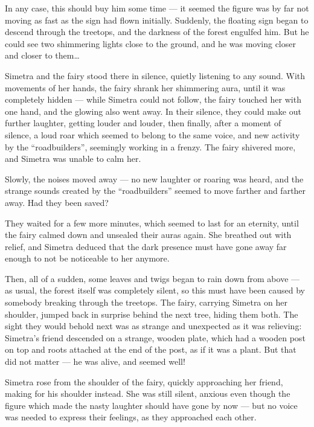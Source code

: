 In any case, this should buy him some time --- it seemed the figure was by far not moving as fast as the sign had flown initially. Suddenly, the floating sign began to descend through the treetops, and the darkness of the forest engulfed him. But he could see two shimmering lights close to the ground, and he was moving closer and closer to them\dots

\froufrou{}

Simetra and the fairy stood there in silence, quietly listening to any sound. With movements of her hands, the fairy shrank her shimmering aura, until it was completely hidden --- while Simetra could not follow, the fairy touched her with one hand, and the glowing also went away. In their silence, they could make out further laughter, getting louder and louder, then finally, after a moment of silence, a loud roar which seemed to belong to the same voice, and new activity by the \enquote{roadbuilders}, seemingly working in a frenzy. The fairy shivered more, and Simetra was unable to calm her.

Slowly, the noises moved away --- no new laughter or roaring was heard, and the strange sounds created by the \enquote{roadbuilders} seemed to move farther and farther away. Had they been saved?

They waited for a few more minutes, which seemed to last for an eternity, until the fairy calmed down and unsealed their auras again. She breathed out with relief, and Simetra deduced that the dark presence must have gone away far enough to not be noticeable to her anymore.

Then, all of a sudden, some leaves and twigs began to rain down from above --- as usual, the forest itself was completely silent, so this must have been caused by somebody breaking through the treetops. The fairy, carrying Simetra on her shoulder, jumped back in surprise behind the next tree, hiding them both. The sight they would behold next was as strange and unexpected as it was relieving: Simetra's friend descended on a strange, wooden plate, which had a wooden post on top and roots attached at the end of the post, as if it was a plant. But that did not matter --- he was alive, and seemed well!

Simetra rose from the shoulder of the fairy, quickly approaching her friend, making for his shoulder instead. She was still silent, anxious even though the figure which made the nasty laughter should have gone by now --- but no voice was needed to express their feelings, as they approached each other.

